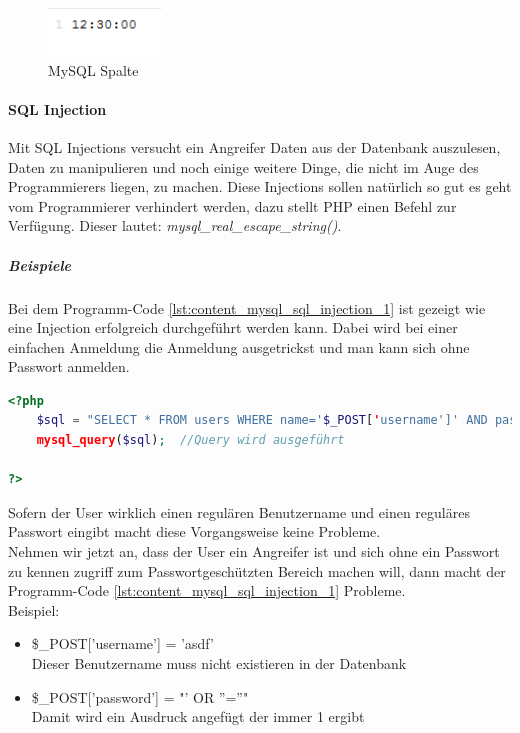 \begin{figure}[H]
\centering
\includegraphics[keepaspectratio=true, width=3cm]{images/screenshots/content_mysql_fetch_column.png}
\caption{MySQL Spalte}
\label{fig:content_mysql_fetch_column}
\end{figure}
\paragraph{SQL Injection}
Mit SQL Injections versucht ein Angreifer Daten aus der Datenbank auszulesen, Daten zu manipulieren und noch einige weitere Dinge, die nicht im Auge des Programmierers liegen, zu machen. Diese Injections sollen natürlich so gut es geht vom Programmierer verhindert werden, dazu stellt PHP einen Befehl zur Verfügung. Dieser lautet: \textit{mysql\_real\_escape\_string()}.
\subparagraph{Beispiele}
Bei dem Programm-Code \ref{lst:content_mysql_sql_injection_1} ist gezeigt wie eine Injection erfolgreich durchgeführt werden kann. Dabei wird bei einer einfachen Anmeldung die Anmeldung ausgetrickst und man kann sich ohne Passwort anmelden.
\begin{lstlisting}[style=custom, language=PHP, caption={MySQL Injection: Falsch},label={lst:content_mysql_sql_injection_1}]
<?php 
	$sql = "SELECT * FROM users	WHERE name='$_POST['username']' AND password='$_POST['password']'";	//Die mitgegebenen Werte werden in den Query übernommen
	mysql_query($sql);	//Query wird ausgeführt
	
?>
\end{lstlisting}
Sofern der User wirklich einen regulären Benutzername und einen reguläres Passwort eingibt macht diese Vorgangsweise keine Probleme.\\
Nehmen wir jetzt an, dass der User ein Angreifer ist und sich ohne ein Passwort zu kennen zugriff zum Passwortgeschützten Bereich machen will, dann macht der Programm-Code \ref{lst:content_mysql_sql_injection_1} Probleme.\\
Beispiel:\\
\begin{itemize}
	\item \$\_POST['username'] = 'asdf'\\
	Dieser Benutzername muss nicht existieren in der Datenbank
	\item \$\_POST['password'] = "' OR ''=''"\\
	Damit wird ein Ausdruck angefügt der immer 1 ergibt
\end{itemize}
